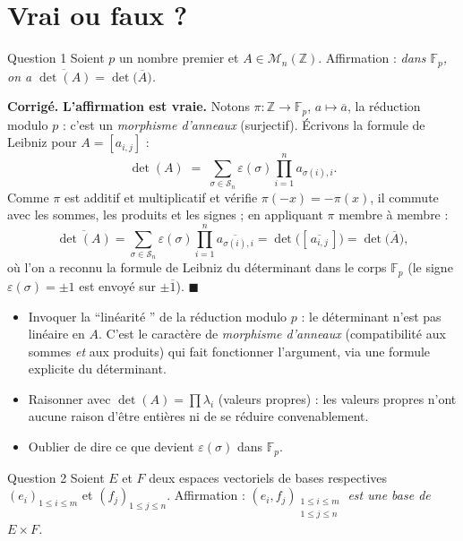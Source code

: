 \documentclass[11pt,a4paper]{article}
\newenvironment{corrige}
  {\par\medskip\noindent
   \begin{tcolorbox}[blanker, breakable,
     borderline west={2.5pt}{0pt}{vertP},
     left=10pt, top=2pt, bottom=2pt]
   {\color{vertP}\bfseries Corrigé.}\hspace{0.5em}\ignorespaces}
  {\hfill$\blacksquare$\end{tcolorbox}\medskip}
\newcommand{\og}{``}
\newcommand{\fg}{''}
\newcommand{\Z}{\mathbb{Z}}
\newcommand{\Fp}{\mathbb{F}_p}
\newcommand{\Mn}[1][n]{\mathcal{M}_{#1}}
\newcommand{\Perm}[1][n]{\mathcal{S}_{#1}} %
\newcommand{\red}[1]{\overline{#1}}       %
\begin{document}
\section{Vrai ou faux ?}

\begin{enonce}{Question 1}
Soient $p$ un nombre premier et $A\in\Mn(\Z)$.
Affirmation : \emph{dans $\Fp$, on a
$\red{\det(A)}=\det\big(\red{A}\big)$.}
\end{enonce}

\begin{corrige}
\textbf{L'affirmation est vraie.}
Notons $\pi:\Z\to\Fp$, $a\mapsto\red{a}$, la réduction modulo $p$ :
c'est un \emph{morphisme d'anneaux} (surjectif). Écrivons la formule de
Leibniz pour $A=[a_{i,j}]$ :
\[
\det(A)\;=\;\sum_{\sigma\in\Perm}\varepsilon(\sigma)
\prod_{i=1}^{n}a_{\sigma(i),i}.
\]
Comme $\pi$ est additif et multiplicatif et vérifie $\pi(-x)=-\pi(x)$,
il commute avec les sommes, les produits et les signes ; en appliquant
$\pi$ membre à membre :
\[
\red{\det(A)}
=\sum_{\sigma\in\Perm}\varepsilon(\sigma)
\prod_{i=1}^{n}\red{a_{\sigma(i),i}}
=\det\big([\,\red{a_{i,j}}\,]\big)
=\det\big(\red{A}\big),
\]
où l'on a reconnu la formule de Leibniz du déterminant dans le corps
$\Fp$ (le signe $\varepsilon(\sigma)=\pm 1$ est envoyé sur
$\pm\red{1}$).
\end{corrige}

\begin{pieges}
\begin{itemize}[leftmargin=1.4em, itemsep=2pt]
\item Invoquer la \og linéarité \fg{} de la réduction modulo $p$ : le
déterminant n'est pas linéaire en $A$. C'est le caractère de
\emph{morphisme d'anneaux} (compatibilité aux sommes \emph{et} aux
produits) qui fait fonctionner l'argument, via une formule explicite
du déterminant.
\item Raisonner avec $\det(A)=\prod\lambda_i$ (valeurs propres) : les
valeurs propres n'ont aucune raison d'être entières ni de se réduire
convenablement.
\item Oublier de dire ce que devient $\varepsilon(\sigma)$ dans $\Fp$.
\end{itemize}
\end{pieges}

\begin{enonce}{Question 2}
Soient $E$ et $F$ deux espaces vectoriels de bases respectives
$(e_i)_{1\le i\le m}$ et $(f_j)_{1\le j\le n}$.
Affirmation : \emph{$(e_i,f_j)_{\substack{1\le i\le m\\ 1\le j\le n}}$
est une base de $E\times F$.}
\end{enonce}
\end{document}
